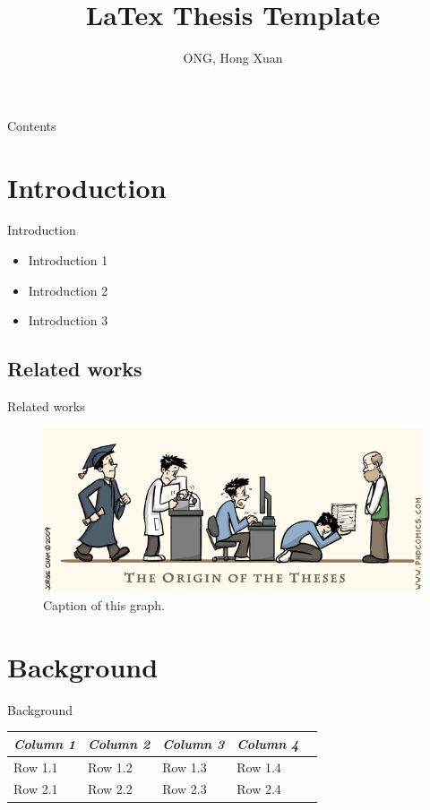 \documentclass[11pt]{beamer}
\author{ONG, Hong Xuan}
\title{LaTex Thesis Template}
\institute{Japan Advanced Institute of Science And Technology}
\begin{document}
\begin{frame}
\titlepage
\end{frame}

\begin{frame}{Contents}
\tableofcontents
\end{frame}

\section{Introduction}
\begin{frame}{Introduction}
	\begin{itemize}
		\item Introduction 1
		\item Introduction 2
		\item Introduction 3
	\end{itemize}
\end{frame}

\subsection{Related works}
\begin{frame}{Related works}
	\begin{figure}[h!]
	  \includegraphics[width=0.9\linewidth]{charts/writing-thesis.png}
	  \caption{Caption of this graph.}
	  \label{fig:writing-thesis}
	\end{figure}
\end{frame}

\section{Background}
\begin{frame}{Background}
\begin{center}

  \begin{tabular} {l l l l l}
  \toprule
  \it Column 1 & \it Column 2 & \it Column 3 & \it Column 4 \\
  \midrule

  Row 1.1 & Row 1.2 & Row 1.3 & Row 1.4 \\
  Row 2.1 & Row 2.2 & Row 2.3 & Row 2.4 \\  
          
  \bottomrule
  \end{tabular}

\end{center}
\end{frame}
\end{document}
